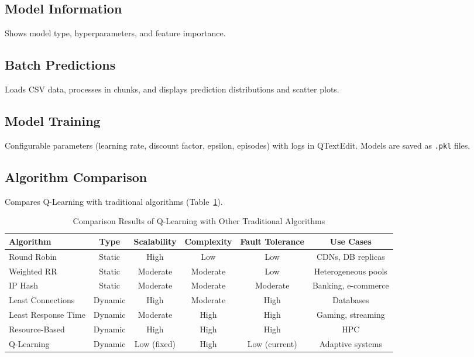 \documentclass[runningheads]{llncs}
\begin{document}
\subsection{Model Information}\label{model-information}
Shows model type, hyperparameters, and feature importance.

\subsection{Batch Predictions}\label{batch-predictions}
Loads CSV data, processes in chunks, and displays prediction distributions and scatter plots.

\subsection{Model Training}\label{model-training}
Configurable parameters (learning rate, discount factor, epsilon, episodes) with logs in QTextEdit. Models are saved as \texttt{.pkl} files.

\subsection{Algorithm Comparison}\label{algorithm-comparison}
Compares Q-Learning with traditional algorithms (Table~\ref{tab:comparison}).

\begin{table}
\caption{Comparison Results of Q-Learning with Other Traditional Algorithms}
\label{tab:comparison}
\begin{tabular}{lccccc}
\toprule
\textbf{Algorithm} & \textbf{Type} & \textbf{Scalability} & \textbf{Complexity} & \textbf{Fault Tolerance} & \textbf{Use Cases} \\
\midrule
Round Robin & Static & High & Low & Low & CDNs, DB replicas \\
Weighted RR & Static & Moderate & Moderate & Low & Heterogeneous pools \\
IP Hash & Static & Moderate & Moderate & Moderate & Banking, e-commerce \\
Least Connections & Dynamic & High & Moderate & High & Databases \\
Least Response Time & Dynamic & Moderate & High & High & Gaming, streaming \\
Resource-Based & Dynamic & High & High & High & HPC \\
Q-Learning & Dynamic & Low (fixed) & High & Low (current) & Adaptive systems \\
\bottomrule
\end{tabular}
\end{table}
\end{document}
